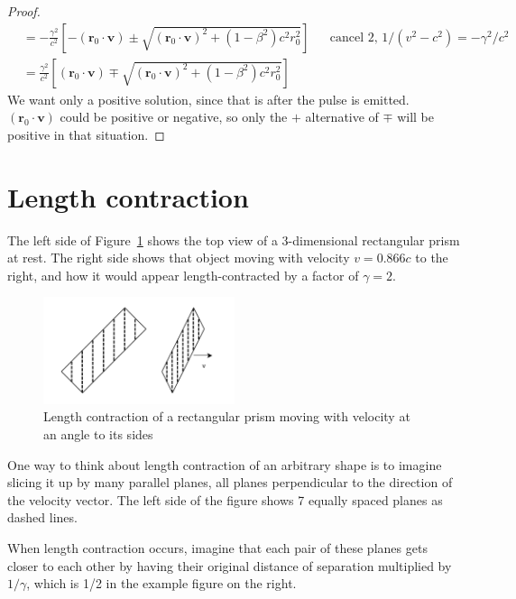\documentclass[a4paper]{article}
\theoremstyle{plain}
\theoremstyle{definition}
\newcommand{\vect}[1]{\mathbf{#1}}
\begin{document}
\begin{proof}
\begin{align*}
  & = -\frac{\gamma^2}{c^2} \left[ -(\vect{r}_0 \cdot \vect{v}) \pm \sqrt{(\vect{r}_0 \cdot \vect{v})^2 + (1-\beta^2)c^2 r_0^2} \right] & & \text{cancel 2, $1/(v^2-c^2) = -\gamma^2/c^2$} \\
  & = \frac{\gamma^2}{c^2} \left[ (\vect{r}_0 \cdot \vect{v}) \mp \sqrt{(\vect{r}_0 \cdot \vect{v})^2 + (1-\beta^2)c^2 r_0^2} \right]
\end{align*}
We want only a positive solution, since that is after the pulse is
emitted.  $(\vect{r}_0 \cdot \vect{v})$ could be positive or negative,
so only the $+$ alternative of $\mp$ will be positive in that
situation.
\end{proof}


\section{Length contraction}
\label{app:length-contraction}


The left side of Figure~\ref{fig:diagonal-length-contraction} shows
the top view of a 3-dimensional rectangular prism at rest.  The right
side shows that object moving with velocity $v=0.866c$ to the right,
and how it would appear length-contracted by a factor of $\gamma=2$.
\begin{figure}[ht]
	\centering
	\includegraphics[width=0.5\textwidth]{length-contraction-rectangle-at-angle-cropped.pdf}
	\caption{Length contraction of a rectangular prism moving with velocity at an angle to its sides}
	\label{fig:diagonal-length-contraction}
\end{figure}

One way to think about length contraction of an arbitrary shape is to
imagine slicing it up by many parallel planes, all planes
perpendicular to the direction of the velocity vector.  The left side
of the figure shows 7 equally spaced planes as dashed lines.

When length contraction occurs, imagine that each pair of these planes
gets closer to each other by having their original distance of
separation multiplied by $1/\gamma$, which is 1/2 in the example
figure on the right.
\end{document}
